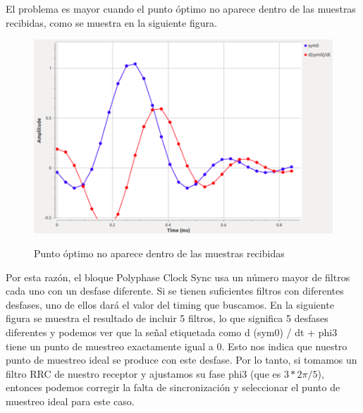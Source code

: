 El problema es mayor cuando el punto óptimo no aparece dentro de las muestras recibidas, como se muestra en la siguiente figura. \\

\begin{figure}[h!]
	\captionsetup{justification = raggedright, singlelinecheck = false}
	\caption{Punto óptimo no aparece dentro de las muestras recibidas} 
	\centering
	\includegraphics[scale=0.8]{Imagenes/Punto-no-optimo.png}
	\label{fig:Punto-no-optimo}
\end{figure}

Por esta razón, el bloque Polyphase Clock Sync usa un número mayor de filtros cada uno con un desfase diferente. Si se tienen suficientes filtros con diferentes desfases, uno de ellos dará el valor del timing que buscamos. En la siguiente figura se muestra el resultado de incluir 5 filtros, lo que significa 5 desfases diferentes y podemos ver que la señal etiquetada como d (sym0) / dt + phi3 tiene un punto de muestreo exactamente igual a 0. Esto nos indica que nuestro punto de muestreo ideal se produce con este desfase. Por lo tanto, si tomamos un filtro RRC de nuestro receptor y ajustamos su fase phi3 (que es $3 * 2\pi / 5$), entonces podemos corregir la falta de sincronización y seleccionar el punto de muestreo ideal para este caso. \\

